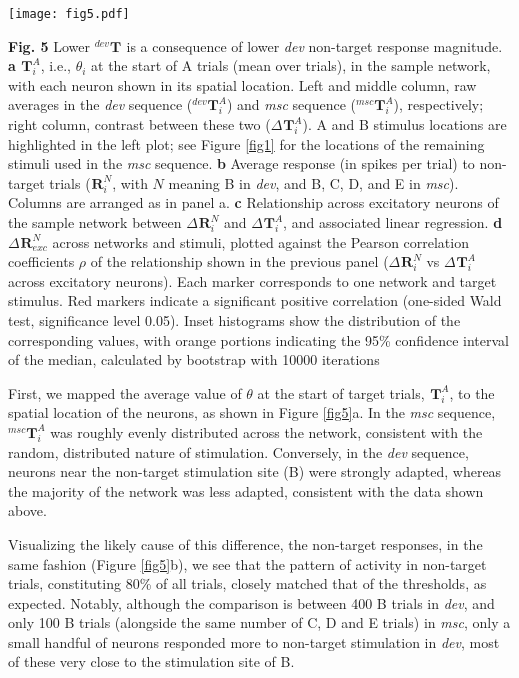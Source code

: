 \documentclass[pdflatex,referee,iicol,sn-basic]{sn-jnl}
\newcommand{\dev}{\textit{dev}}
\newcommand{\msc}{\textit{msc}}
\renewcommand{\R}[3][]{{}^{#1}_{}\!\mathbf{R}^{#2}_{#3}}
\renewcommand{\T}[3][]{{}^{#1}_{}\mathbf{T}^{#2}_{#3}}
\theoremstyle{thmstyleone}%
\theoremstyle{thmstyletwo}%
\theoremstyle{thmstylethree}%
\begin{document}
\begin{figure*}%
    \centering
    \texttt{[image: fig5.pdf]}
    \caption{}
    \label{fig5}
\end{figure*}
\textbf{Fig. 5} Lower $\T[dev]{}{}$ is a consequence of lower \dev{} non-target response magnitude.
\textbf{a} $\T{A}{i}$, i.e., $\theta_i$ at the start of A trials (mean over trials), in the sample network, with each neuron shown in its spatial location. Left and middle column, raw averages in the \dev{} sequence ($\T[dev]{A}{i}$) and \msc{} sequence ($\T[msc]{A}{i}$), respectively; right column, contrast between these two ($\Delta \T{A}{i}$). A and B stimulus locations are highlighted in the left plot; see Figure \ref{fig1} for the locations of the remaining stimuli used in the \msc{} sequence.
\textbf{b} Average response (in spikes per trial) to non-target trials ($\R{N}{i}$, with $N$ meaning B in \dev{}, and B, C, D, and E in \msc{}). Columns are arranged as in panel a.
\textbf{c} Relationship across excitatory neurons of the sample network between $\Delta \R{N}{i}$ and $\Delta \T{A}{i}$, and associated linear regression.
\textbf{d} $\Delta \R{N}{exc}$ across networks and stimuli, plotted against the Pearson correlation coefficients $\rho$ of the relationship shown in the previous panel ($\Delta \R{N}{i}$ vs $\Delta \T{A}{i}$ across excitatory neurons). Each marker corresponds to one network and target stimulus. Red markers indicate a significant positive correlation (one-sided Wald test, significance level 0.05). Inset histograms show the distribution of the corresponding values, with orange portions indicating the 95\% confidence interval of the median, calculated by bootstrap with 10000 iterations

First, we mapped the average value of $\theta$ at the start of target trials, $\T{A}{i}$, to the spatial location of the neurons, as shown in Figure \ref{fig5}a. In the \msc{} sequence, $\T[msc]{A}{i}$ was roughly evenly distributed across the network, consistent with the random, distributed nature of stimulation. Conversely, in the \dev{} sequence, neurons near the non-target stimulation site (B) were strongly adapted, whereas the majority of the network was less adapted, consistent with the data shown above.

Visualizing the likely cause of this difference, the non-target responses, in the same fashion (Figure \ref{fig5}b), we see that the pattern of activity in non-target trials, constituting 80\% of all trials, closely matched that of the thresholds, as expected. Notably, although the comparison is between 400 B trials in \dev{}, and only 100 B trials (alongside the same number of C, D and E trials) in \msc{}, only a small handful of neurons responded more to non-target stimulation in \dev{}, most of these very close to the stimulation site of B.
\end{document}
